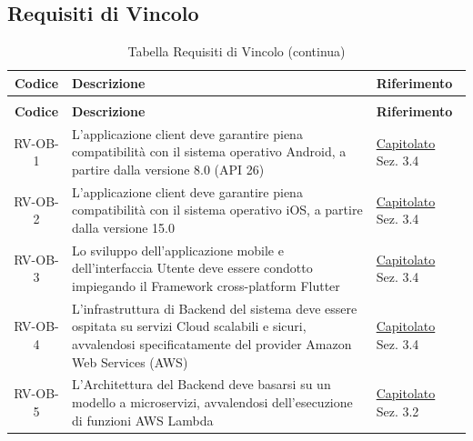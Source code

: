 \documentclass[a4paper,12pt]{article}
\begin{document}
\subsection{Requisiti di Vincolo} \label{subsection:requisiti_vincolo}
\begin{center}
\renewcommand{\arraystretch}{1.5}
\begin{longtable}{|c|p{8.5cm}|>{\centering\arraybackslash}p{4cm}|}

\hline
\rowcolor{gray!60}
\textbf{Codice} & \textbf{Descrizione} & \textbf{Riferimento} \\
\hline
\endfirsthead
\caption[]{Tabella Requisiti di Vincolo (continua)} \\
\hline
\rowcolor{gray!60}
\textbf{Codice} & \textbf{Descrizione} & \textbf{Riferimento} \\
\hline
\endhead
\rowcolor{white}
RV-OB-1 & L'applicazione client deve garantire piena compatibilità con il sistema operativo Android, a partire dalla versione 8.0 (API 26) & \href{https://www.math.unipd.it/~tullio/IS-1/2025/Progetto/C4.pdf}{Capitolato} \newline Sez. 3.4 \\
\hline
\rowcolor{gray!20}
RV-OB-2 & L'applicazione client deve garantire piena compatibilità con il sistema operativo iOS, a partire dalla versione 15.0 & \href{https://www.math.unipd.it/~tullio/IS-1/2025/Progetto/C4.pdf}{Capitolato} \newline Sez. 3.4 \\
\hline
\rowcolor{white}
RV-OB-3 & Lo sviluppo dell'applicazione mobile e dell'interfaccia Utente deve essere condotto impiegando il Framework cross-platform Flutter & \href{https://www.math.unipd.it/~tullio/IS-1/2025/Progetto/C4.pdf}{Capitolato} \newline Sez. 3.4 \\
\hline
\rowcolor{gray!20}
RV-OB-4 & L'infrastruttura di Backend del sistema deve essere ospitata su servizi Cloud scalabili e sicuri, avvalendosi specificatamente del provider Amazon Web Services (AWS) & \href{https://www.math.unipd.it/~tullio/IS-1/2025/Progetto/C4.pdf}{Capitolato} \newline Sez. 3.4 \\
\hline
\rowcolor{white}
RV-OB-5 & L'Architettura del Backend deve basarsi su un modello a microservizi, avvalendosi dell'esecuzione di funzioni AWS Lambda & \href{https://www.math.unipd.it/~tullio/IS-1/2025/Progetto/C4.pdf}{Capitolato} \newline Sez. 3.2 \\

\end{longtable}
\end{center}
\end{document}
